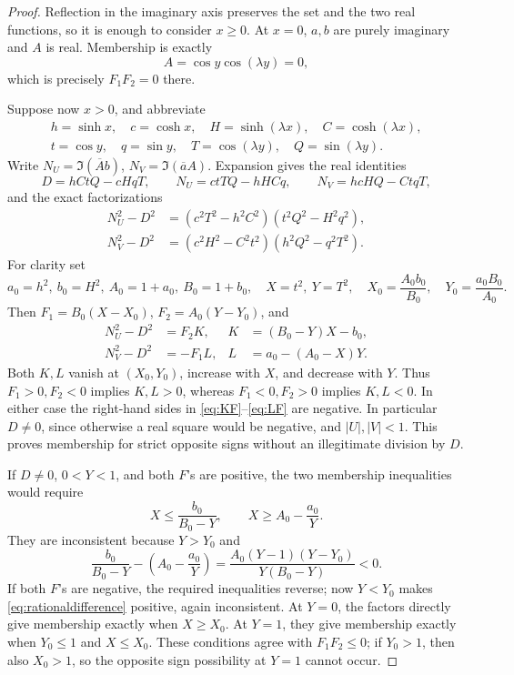 \documentclass[11pt]{article}
\numberwithin{equation}{section}
\theoremstyle{definition}
\begin{document}
\begin{proof}
Reflection in the imaginary axis preserves the set and the two real
functions, so it is enough to consider \(x\ge0\). At \(x=0\),
\(a,b\) are purely imaginary and \(A\) is real. Membership is exactly
\[
 A=\cos y\cos(\lambda y)=0,
\]
which is precisely \(F_1F_2=0\) there.

Suppose now \(x>0\), and abbreviate
\begin{gather*}
 h=\sinh x,\quad c=\cosh x,\quad H=\sinh(\lambda x),\quad C=\cosh(\lambda x),\\
 t=\cos y,\quad q=\sin y,\quad T=\cos(\lambda y),\quad Q=\sin(\lambda y).
\end{gather*}
Write \(N_U=\Im(\overline A b)\), \(N_V=\Im(\overline a A)\).
Expansion gives the real identities
\[
 D=hCtQ-cHqT,\qquad
 N_U=ctTQ-hHCq,\qquad N_V=hcHQ-CtqT,
\]
and the exact factorizations
\begin{align}
 N_U^2-D^2&=(c^2T^2-h^2C^2)(t^2Q^2-H^2q^2),\label{eq:NUfactor}\\
 N_V^2-D^2&=(c^2H^2-C^2t^2)(h^2Q^2-q^2T^2).\label{eq:NVfactor}
\end{align}
For clarity set
\[
 a_0=h^2,\ b_0=H^2,\ A_0=1+a_0,\ B_0=1+b_0,
\quad X=t^2,\ Y=T^2,\quad
 X_0=\frac{A_0b_0}{B_0},\quad Y_0=\frac{a_0B_0}{A_0}.
\]
Then \(F_1=B_0(X-X_0)\), \(F_2=A_0(Y-Y_0)\), and
\begin{align}
 N_U^2-D^2&=F_2 K,& K&=(B_0-Y)X-b_0,\label{eq:KF}\\
 N_V^2-D^2&=-F_1 L,& L&=a_0-(A_0-X)Y.\label{eq:LF}
\end{align}
Both \(K,L\) vanish at \((X_0,Y_0)\), increase with \(X\), and
decrease with \(Y\). Thus \(F_1>0,F_2<0\) implies \(K,L>0\),
whereas \(F_1<0,F_2>0\) implies \(K,L<0\). In either case the
right-hand sides in \eqref{eq:KF}--\eqref{eq:LF} are negative.
In particular \(D\ne0\), since otherwise a real square would be
negative, and \(|U|,|V|<1\). This proves membership for strict
opposite signs without an illegitimate division by \(D\).

If \(D\ne0\), \(0<Y<1\), and both \(F\)'s are positive, the
two membership inequalities would require
\[
 X\le\frac{b_0}{B_0-Y},\qquad X\ge A_0-\frac{a_0}{Y}.
\]
They are inconsistent because \(Y>Y_0\) and
\begin{equation}\label{eq:rationaldifference}
 \frac{b_0}{B_0-Y}-\left(A_0-\frac{a_0}{Y}\right)
 =\frac{A_0(Y-1)(Y-Y_0)}{Y(B_0-Y)}<0.
\end{equation}
If both \(F\)'s are negative, the required inequalities reverse;
now \(Y<Y_0\) makes \eqref{eq:rationaldifference} positive, again
inconsistent. At \(Y=0\), the factors directly give membership
exactly when \(X\ge X_0\). At \(Y=1\), they give membership exactly
when \(Y_0\le1\) and \(X\le X_0\). These conditions agree with
\(F_1F_2\le0\); if \(Y_0>1\), then also \(X_0>1\), so the opposite
sign possibility at \(Y=1\) cannot occur.


\end{proof}
\end{document}
